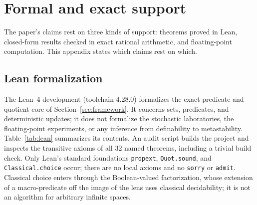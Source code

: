 \section{Formal and exact support}
\label{sec:appendix-lean}

The paper's claims rest on three kinds of support: theorems proved in Lean, closed-form results checked in exact rational arithmetic, and floating-point computation. This appendix states which claims rest on which.

\subsection{Lean formalization}

The Lean~4 development (toolchain 4.28.0) formalizes the exact predicate and quotient core of Section~\ref{sec:framework}. It concerns sets, predicates, and deterministic updates; it does not formalize the stochastic laboratories, the floating-point experiments, or any inference from definability to metastability. Table~\ref{tab:lean} summarizes its contents. An audit script builds the project and inspects the transitive axioms of all \(32\) named theorems, including a trivial build check. Only Lean's standard foundations \texttt{propext}, \texttt{Quot.sound}, and \texttt{Classical.choice} occur; there are no local axioms and no \texttt{sorry} or \texttt{admit}. Classical choice enters through the Boolean-valued factorization, whose extension of a macro-predicate off the image of the lens uses classical decidability; it is not an algorithm for arbitrary infinite spaces.

